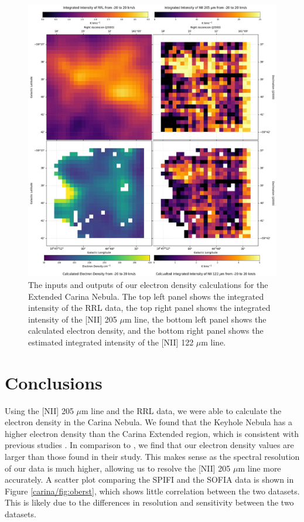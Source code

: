\begin{figure}
    \centering
    \includegraphics[width=.9\textwidth]{figs/carina/carina/carina.png}
    \caption[Calculated Electron Density and {[}NII{]} 122 $\mu$m Maps for the Extended Carina Nebula]{
        The inputs and outputs of our electron density calculations for the Extended Carina Nebula.
        The top left panel shows the integrated intensity of the RRL data, the top right panel shows the integrated intensity of the [NII] 205 $\mu$m line, the bottom left panel shows the calculated electron density, and the bottom right panel shows the estimated integrated intensity of the [NII] 122 $\mu$m line.
        }
    \label{carina/fig:result_carina}
\end{figure}

\section{Conclusions}
Using the [NII] 205 $\mu$m line and the RRL data, we were able to calculate the electron density in the Carina Nebula.
We found that the Keyhole Nebula has a higher electron density than the Carina Extended region, which is consistent with previous studies \parencite{brooks2000unlocking}.
In comparison to \cite{oberst2011205}, we find that our electron density values are larger than those found in their study.
This makes sense as the spectral resolution of our data is much higher, allowing us to resolve the [NII] 205 $\mu$m line more accurately.
A scatter plot comparing the SPIFI and the SOFIA data is shown in Figure \ref{carina/fig:oberst}, which shows little correlation between the two datasets.
This is likely due to the differences in resolution and sensitivity between the two datasets.

